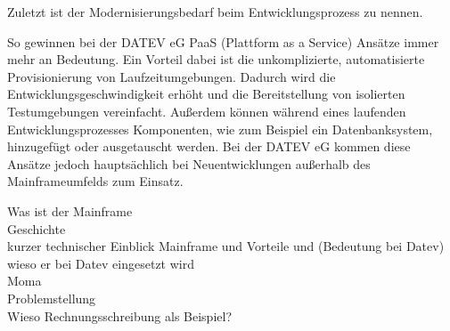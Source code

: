 Zuletzt ist der Modernisierungsbedarf beim Entwicklungsprozess zu nennen.





So gewinnen bei der DATEV eG PaaS (Plattform as a Service) Ansätze immer mehr an Bedeutung.
Ein Vorteil dabei ist die unkomplizierte, automatisierte Provisionierung von Laufzeitumgebungen.
Dadurch wird die Entwicklungsgeschwindigkeit erhöht und die Bereitstellung von isolierten Testumgebungen vereinfacht.
Außerdem können während eines laufenden Entwicklungsprozesses Komponenten, wie zum Beispiel ein Datenbanksystem, hinzugefügt oder ausgetauscht werden.
Bei der DATEV eG kommen diese Ansätze jedoch hauptsächlich bei Neuentwicklungen außerhalb des Mainframeumfelds zum Einsatz.




Was ist der Mainframe\\
Geschichte\\
kurzer technischer Einblick Mainframe und Vorteile und (Bedeutung bei Datev) \\
wieso er bei Datev eingesetzt wird \\
 Moma \\
 Problemstellung \\
 Wieso Rechnungsschreibung als Beispiel? \\